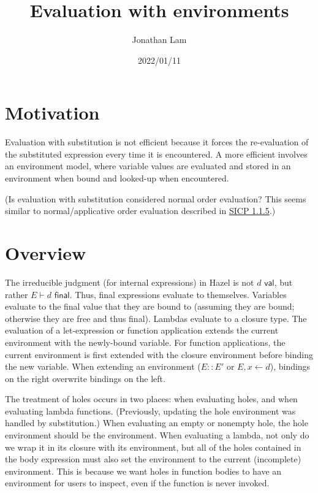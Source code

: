 \documentclass{article}
\title{Evaluation with environments}
\author{Jonathan Lam}
\date{2022/01/11}
\begin{document}
\maketitle{}

\section{Motivation}

Evaluation with substitution is not efficient because it forces the re-evaluation of the substituted expression every time it is encountered. A more efficient involves an environment model, where variable values are evaluated and stored in an environment when bound and looked-up when encountered.

(Is evaluation with substitution considered normal order evaluation? This seems similar to normal/applicative order evaluation described in \href{https://mitpress.mit.edu/sites/default/files/sicp/full-text/book/book-Z-H-10.html#%_sec_1.1.5}{SICP 1.1.5}.)

\section{Overview}

The irreducible judgment (for internal expressions) in Hazel is not $d\textsf{ val}$, but rather $E\vdash d\textsf{ final}$. Thus, final expressions evaluate to themselves. Variables evaluate to the final value that they are bound to (assuming they are bound; otherwise they are free and thus final). Lambdas evaluate to a closure type. The evaluation of a let-expression or function application extends the current environment with the newly-bound variable. For function applications, the current environment is first extended with the closure environment before binding the new variable. When extending an environment ($E::E'$ or $E,x\leftarrow d$), bindings on the right overwrite bindings on the left.

The treatment of holes occurs in two places: when evaluating holes, and when evaluating lambda functions. (Previously, updating the hole environment was handled by substitution.) When evaluating an empty or nonempty hole, the hole environment should be the environment. When evaluating a lambda, not only do we wrap it in its closure with its environment, but all of the holes contained in the body expression must also set the environment to the current (incomplete) environment. This is because we want holes in function bodies to have an environment for users to inspect, even if the function is never invoked.
\end{document}

